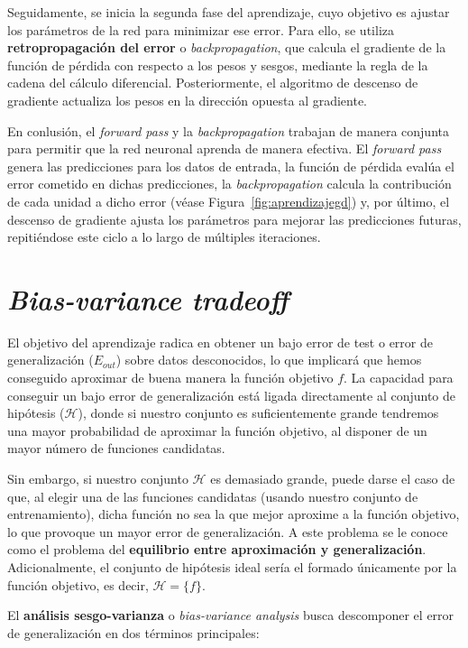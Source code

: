 Seguidamente, se inicia la segunda fase del aprendizaje, cuyo objetivo es ajustar los parámetros de la red para minimizar ese error. Para ello, se utiliza \textbf{retropropagación del error} o \emph{backpropagation}, que calcula el gradiente de la función de pérdida con respecto a los pesos y sesgos, mediante la regla de la cadena del cálculo diferencial. Posteriormente, el algoritmo de descenso de gradiente actualiza los pesos en la dirección opuesta al gradiente.

En conlusión, el \textit{forward pass} y la \textit{backpropagation} trabajan de manera conjunta para permitir que la red neuronal aprenda de manera efectiva. El \textit{forward pass} genera las predicciones para los datos de entrada, la función de pérdida evalúa el error cometido en dichas predicciones, la \textit{backpropagation} calcula la contribución de cada unidad a dicho error (véase Figura~\ref{fig:aprendizajegd}) y, por último, el descenso de gradiente ajusta los parámetros para mejorar las predicciones futuras, repitiéndose este ciclo a lo largo de múltiples iteraciones.

\section{\textit{Bias-variance tradeoff}}\label{sec:capitulo-bias-variance-tradeoff}
El objetivo del aprendizaje radica en obtener un bajo error de test o error de generalización ($E_{out}$) sobre datos desconocidos, lo que implicará que hemos conseguido aproximar de buena manera la función objetivo $f$. La capacidad para conseguir un bajo error de generalización está ligada directamente al conjunto de hipótesis ($\mathcal{H}$), donde si nuestro conjunto es suficientemente grande tendremos una mayor probabilidad de aproximar la función objetivo, al disponer de un mayor número de funciones candidatas.

Sin embargo, si nuestro conjunto $\mathcal{H}$ es demasiado grande, puede darse el caso de que, al elegir una de las funciones candidatas (usando nuestro conjunto de entrenamiento), dicha función no sea la que mejor aproxime a la función objetivo, lo que provoque un mayor error de generalización. A este problema se le conoce como el problema del \textbf{equilibrio entre aproximación y generalización}. Adicionalmente, el conjunto de hipótesis ideal sería el formado únicamente por la función objetivo, es decir, $\mathcal{H} = \{f\}$.

El \textbf{análisis sesgo-varianza} o \emph{bias-variance analysis} busca descomponer el error de generalización en dos términos principales:

